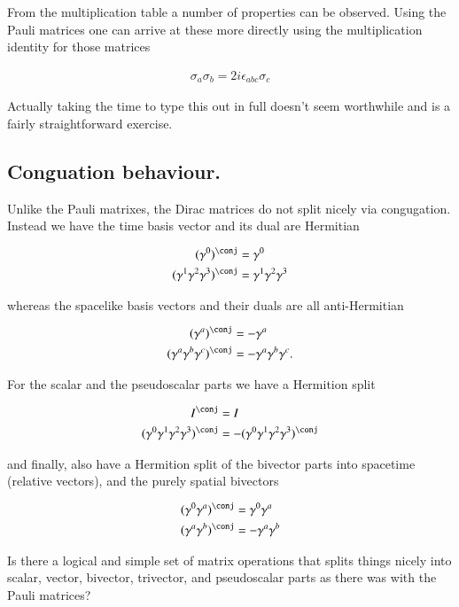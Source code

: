 \documentclass{article}
\begin{document}
From the multiplication table a number of properties can be observed.  Using the Pauli matrices one can arrive at these more directly using the multiplication identity for those
matrices

\begin{align}
\sigma_a \sigma_b = 2 i \epsilon_{abc} \sigma_c
\end{align}

Actually taking the time to type this out in full doesn't seem worthwhile and is a fairly straightforward exercise.

\subsection{ Conguation behaviour. }

Unlike the Pauli matrixes, the Dirac matrices do not split nicely via congugation.  Instead we have the time basis vector and its dual are Hermitian

\begin{align*}
(\gamma^0)^\conj &= \gamma^0 \\
(\gamma^1 \gamma^2 \gamma^3)^\conj &= \gamma^1 \gamma^2 \gamma^3
\end{align*}

whereas the spacelike basis vectors and their duals are all anti-Hermitian

\begin{align*}
(\gamma^a)^\conj &= -\gamma^a \\
(\gamma^a \gamma^b \gamma^c)^\conj &= - \gamma^a \gamma^b \gamma^c.
\end{align*}

For the scalar and the pseudoscalar parts we have a Hermition split

\begin{align*}
I^\conj &= I \\
(\gamma^0 \gamma^1 \gamma^2 \gamma^3)^\conj &= -(\gamma^0 \gamma^1 \gamma^2 \gamma^3)^\conj
\end{align*}

and finally, also have a Hermition split of the bivector parts into spacetime (relative vectors), and the purely spatial bivectors

\begin{align*}
(\gamma^0 \gamma^a)^\conj &= \gamma^0 \gamma^a \\
(\gamma^a \gamma^b)^\conj &= -\gamma^a \gamma^b
\end{align*}

Is there a logical and simple set of matrix operations that splits things nicely into scalar, vector, bivector, trivector, and pseudoscalar parts as there was with the Pauli
matrices?
\end{document}
